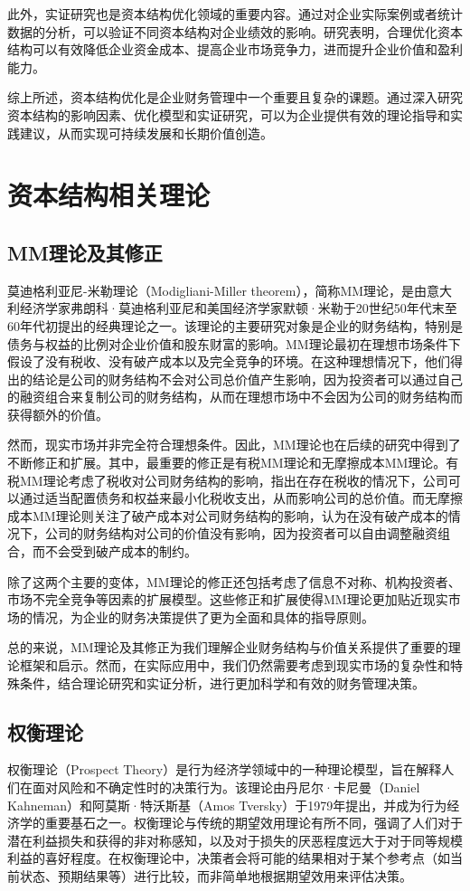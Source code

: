 此外，实证研究也是资本结构优化领域的重要内容。通过对企业实际案例或者统计数据的分析，可以验证不同资本结构对企业绩效的影响。研究表明，合理优化资本结构可以有效降低企业资金成本、提高企业市场竞争力，进而提升企业价值和盈利能力。

综上所述，资本结构优化是企业财务管理中一个重要且复杂的课题。通过深入研究资本结构的影响因素、优化模型和实证研究，可以为企业提供有效的理论指导和实践建议，从而实现可持续发展和长期价值创造。
\section{资本结构相关理论}
\subsection{MM理论及其修正}
莫迪格利亚尼-米勒理论（Modigliani-Miller theorem），简称MM理论，是由意大利经济学家弗朗科·莫迪格利亚尼和美国经济学家默顿·米勒于20世纪50年代末至60年代初提出的经典理论之一。该理论的主要研究对象是企业的财务结构，特别是债务与权益的比例对企业价值和股东财富的影响。MM理论最初在理想市场条件下假设了没有税收、没有破产成本以及完全竞争的环境。在这种理想情况下，他们得出的结论是公司的财务结构不会对公司总价值产生影响，因为投资者可以通过自己的融资组合来复制公司的财务结构，从而在理想市场中不会因为公司的财务结构而获得额外的价值。

然而，现实市场并非完全符合理想条件。因此，MM理论也在后续的研究中得到了不断修正和扩展。其中，最重要的修正是有税MM理论和无摩擦成本MM理论。有税MM理论考虑了税收对公司财务结构的影响，指出在存在税收的情况下，公司可以通过适当配置债务和权益来最小化税收支出，从而影响公司的总价值。而无摩擦成本MM理论则关注了破产成本对公司财务结构的影响，认为在没有破产成本的情况下，公司的财务结构对公司的价值没有影响，因为投资者可以自由调整融资组合，而不会受到破产成本的制约。

除了这两个主要的变体，MM理论的修正还包括考虑了信息不对称、机构投资者、市场不完全竞争等因素的扩展模型。这些修正和扩展使得MM理论更加贴近现实市场的情况，为企业的财务决策提供了更为全面和具体的指导原则。

总的来说，MM理论及其修正为我们理解企业财务结构与价值关系提供了重要的理论框架和启示。然而，在实际应用中，我们仍然需要考虑到现实市场的复杂性和特殊条件，结合理论研究和实证分析，进行更加科学和有效的财务管理决策。
\subsection{权衡理论}
权衡理论（Prospect Theory）是行为经济学领域中的一种理论模型，旨在解释人们在面对风险和不确定性时的决策行为。该理论由丹尼尔·卡尼曼（Daniel Kahneman）和阿莫斯·特沃斯基（Amos Tversky）于1979年提出，并成为行为经济学的重要基石之一。权衡理论与传统的期望效用理论有所不同，强调了人们对于潜在利益损失和获得的非对称感知，以及对于损失的厌恶程度远大于对于同等规模利益的喜好程度。在权衡理论中，决策者会将可能的结果相对于某个参考点（如当前状态、预期结果等）进行比较，而非简单地根据期望效用来评估决策。

